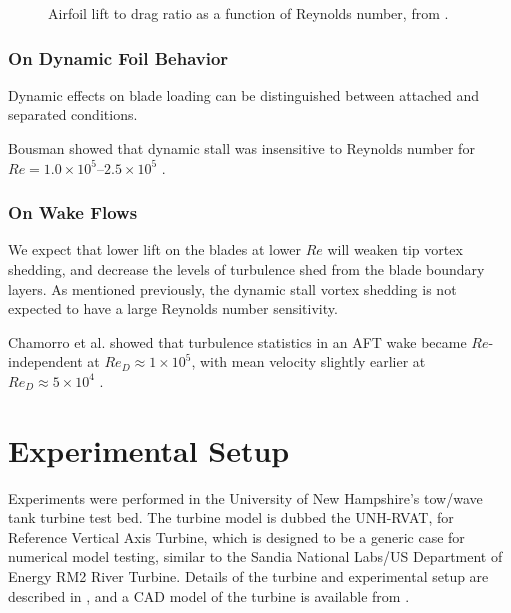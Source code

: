 \documentclass[energies,article,accept,moreauthors,pdftex,12pt,a4paper]{mdpi}
\begin{document}
\begin{figure}[ht]
\caption{Airfoil lift to drag ratio as a function of Reynolds number, from 
\cite{McMasters1980}.}
\end{figure}

\subsubsection{On Dynamic Foil Behavior}

Dynamic effects on blade loading can be distinguished between attached and
separated conditions. 

Bousman showed that dynamic stall was insensitive to Reynolds number for $Re=1.0
\times 10^5$--$2.5 \times 10^5$ \cite{Bousman2000-evaluation}.

\subsubsection{On Wake Flows}

We expect that lower lift on the blades at lower $Re$ will weaken tip vortex
shedding, and decrease the levels of turbulence shed from the blade boundary
layers. As mentioned previously, the dynamic stall vortex shedding is not
expected to have a large Reynolds number sensitivity.


Chamorro et al. showed that turbulence statistics in an AFT wake became
$Re$-independent at $Re_D \approx 1 \times 10^5$, with mean velocity slightly
earlier at $Re_D \approx 5 \times 10^4$ \cite{Chamorro2012}.

\section{Experimental Setup}

Experiments were performed in the University of New Hampshire's tow/wave tank
turbine test bed. The turbine model is dubbed the UNH-RVAT, for Reference
Vertical Axis Turbine, which is designed to be a generic case for numerical
model testing, similar to the Sandia National Labs/US Department of Energy RM2
River Turbine. Details of the turbine and experimental setup are described in
\cite{Bachant2015-JoT}, and a CAD model of the turbine is available from
\cite{Bachant2014-RVAT-CAD}.

\end{document}
